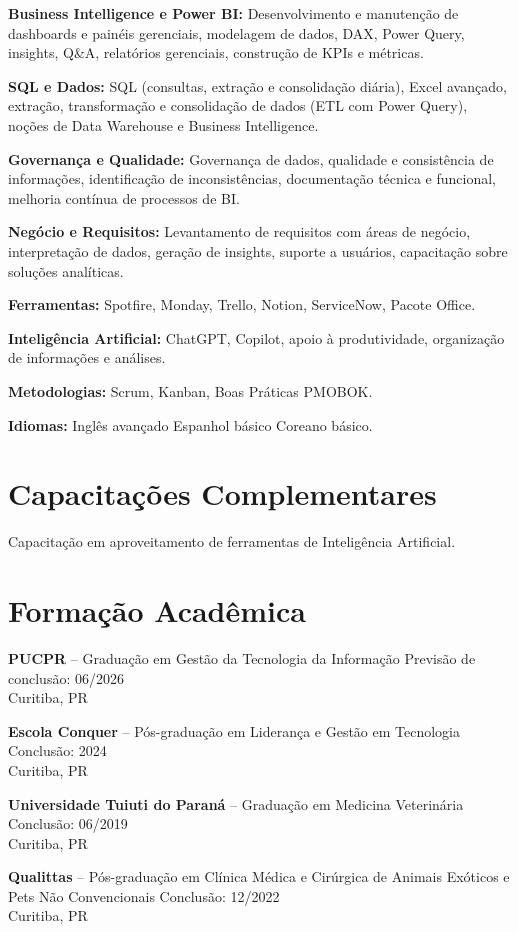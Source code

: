 \documentclass[11pt,a4paper]{article}
\begin{document}
\textbf{Business Intelligence e Power BI:} Desenvolvimento e manutenção de dashboards e painéis gerenciais, modelagem de dados, DAX, Power Query, insights, Q\&A, relatórios gerenciais, construção de KPIs e métricas.

\textbf{SQL e Dados:} SQL (consultas, extração e consolidação diária), Excel avançado, extração, transformação e consolidação de dados (ETL com Power Query), noções de Data Warehouse e Business Intelligence.

\textbf{Governança e Qualidade:} Governança de dados, qualidade e consistência de informações, identificação de inconsistências, documentação técnica e funcional, melhoria contínua de processos de BI.

\textbf{Negócio e Requisitos:} Levantamento de requisitos com áreas de negócio, interpretação de dados, geração de insights, suporte a usuários, capacitação sobre soluções analíticas.

\textbf{Ferramentas:} Spotfire, Monday, Trello, Notion, ServiceNow, Pacote Office.

\textbf{Inteligência Artificial:} ChatGPT, Copilot, apoio à produtividade, organização de informações e análises.

\textbf{Metodologias:} Scrum, Kanban, Boas Práticas PMOBOK.

\textbf{Idiomas:} Inglês avançado \textbullet{} Espanhol básico \textbullet{} Coreano básico.

\section*{Capacitações Complementares}

Capacitação em aproveitamento de ferramentas de Inteligência Artificial.

\section*{Formação Acadêmica}

\textbf{PUCPR} -- Graduação em Gestão da Tecnologia da Informação \hfill Previsão de conclusão: 06/2026\\
Curitiba, PR

\textbf{Escola Conquer} -- Pós-graduação em Liderança e Gestão em Tecnologia \hfill Conclusão: 2024\\
Curitiba, PR

\textbf{Universidade Tuiuti do Paraná} -- Graduação em Medicina Veterinária \hfill Conclusão: 06/2019\\
Curitiba, PR

\textbf{Qualittas} -- Pós-graduação em Clínica Médica e Cirúrgica de Animais Exóticos e Pets Não Convencionais \hfill Conclusão: 12/2022\\
Curitiba, PR
\end{document}
